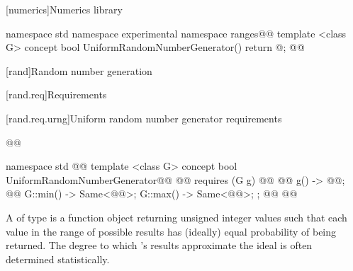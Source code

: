 [numerics]{Numerics library}

{\color{newclr}

\begin{codeblock}
namespace std { namespace experimental { namespace ranges@@ {
  template <class G>
  concept bool UniformRandomNumberGenerator() { return @\seebelow@; }
}}}@\newtxt{\}}@
\end{codeblock}
}

\setcounter{section}{4}
[rand]{Random number generation}

[rand.req]{Requirements}


\setcounter{subsubsection}{2}
[rand.req.urng]{Uniform random number generator requirements}%
%

\begin{addedblock}
\begin{codeblock}
@@

namespace std { @@
  template <class G>
  concept bool UniformRandomNumberGenerator@\newtxt{() \{}\oldtxt{ =}@
    @@ requires (G g) {
      @@
      @@
      { g() } -> @@; @@
      { G::min() } -> Same<@@>;
      { G::max() } -> Same<@@>;
    };
  @\newtxt{\}}@
}@\newtxt{\}\}\}}@
\end{codeblock}
\end{addedblock}

\pnum
A 
 of type 
is a function object
returning unsigned integer values
such that each value
in the range of possible results
has (ideally) equal probability
of being returned.
\enternote
 The degree to which 's results
 approximate the ideal
 is often determined statistically.
\exitnote


